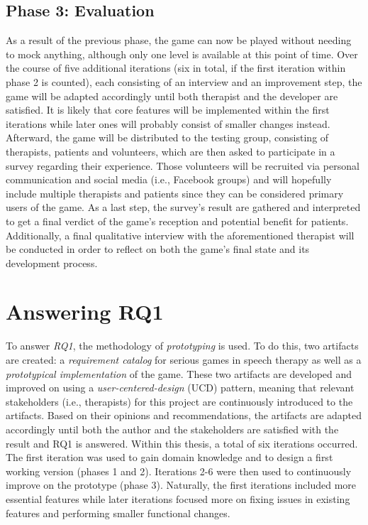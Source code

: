 \documentclass[draft,final]{vutinfth} %
\begin{document}
\subsection{Phase 3: Evaluation}
As a result of the previous phase, the game can now be played without needing to mock anything, although only one level is available at this point of time. Over the course of five additional iterations (six in total, if the first iteration within phase 2 is counted), each consisting of an interview and an improvement step, the game will be adapted accordingly until both therapist and the developer are satisfied. It is likely that core features will be implemented within the first iterations while later ones will probably consist of smaller changes instead. Afterward, the game will be distributed to the testing group, consisting of therapists, patients and volunteers, which are then asked to participate in a survey regarding their experience. Those volunteers will be recruited via personal communication and social media (i.e., Facebook groups) and will hopefully include multiple therapists and patients since they can be considered primary users of the game. As a last step, the survey's result are gathered and interpreted to get a final verdict of the game's reception and potential benefit for patients. Additionally, a final qualitative interview with the aforementioned therapist will be conducted in order to reflect on both the game's final state and its development process.


\section{Answering RQ1}
To answer \emph{RQ1}, the methodology of \emph{prototyping} \cite{wilde2006methodenspektrum} is used. To do this, two artifacts are created: a \emph{requirement catalog} for serious games in speech therapy as well as a \emph{prototypical implementation} of the game. These two artifacts are developed and improved on using a \emph{user-centered-design} (UCD) pattern, meaning that relevant stakeholders (i.e., therapists) for this project are continuously introduced to the artifacts. Based on their opinions and recommendations, the artifacts are adapted accordingly until both the author and the stakeholders are satisfied with the result and RQ1 is answered. Within this thesis, a total of six iterations occurred. The first iteration was used to gain domain knowledge and to design a first working version (phases 1 and 2). Iterations 2-6 were then used to continuously improve on the prototype (phase 3). Naturally, the first iterations included more essential features while later iterations focused more on fixing issues in existing features and performing smaller functional changes.
\end{document}
